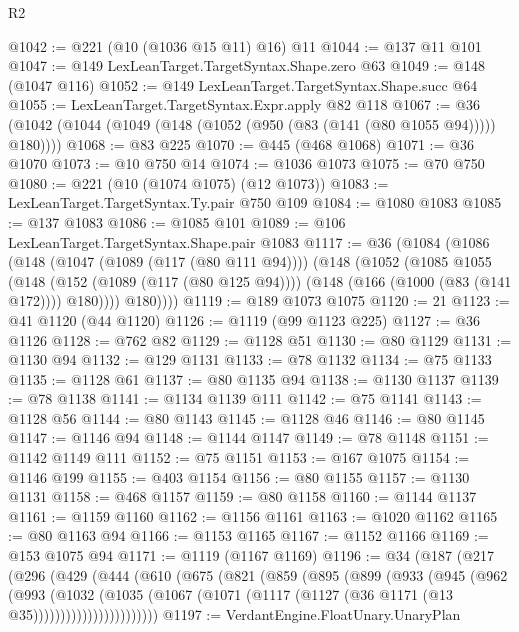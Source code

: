 \begin{lexlean}{R2}
\begin{coremodule}
@1042 := @221 (@10 (@1036 @15 @11) @16) @11
@1044 := @137 @11 @101
@1047 := @149 LexLeanTarget.TargetSyntax.Shape.zero @63
@1049 := @148 (@1047 @116)
@1052 := @149 LexLeanTarget.TargetSyntax.Shape.succ @64
@1055 := LexLeanTarget.TargetSyntax.Expr.apply @82 @118
@1067 := @36 (@1042 (@1044 (@1049 (@148 (@1052 (@950 (@83 (@141 (@80 @1055 @94))))) @180))))
@1068 := @83 @225
@1070 := @445 (@468 @1068)
@1071 := @36 @1070
@1073 := @10 @750 @14
@1074 := @1036 @1073
@1075 := @70 @750
@1080 := @221 (@10 (@1074 @1075) (@12 @1073))
@1083 := LexLeanTarget.TargetSyntax.Ty.pair @750 @109
@1084 := @1080 @1083
@1085 := @137 @1083
@1086 := @1085 @101
@1089 := @106 LexLeanTarget.TargetSyntax.Shape.pair @1083
@1117 := @36
    (@1084
      (@1086
        (@148
          (@1047 (@1089 (@117 (@80 @111 @94))))
          (@148
            (@1052
              (@1085
                @1055
                (@148
                  (@152 (@1089 (@117 (@80 @125 @94))))
                  (@148 (@166 (@1000 (@83 (@141 @172)))) @180))))
            @180))))
@1119 := @189 @1073 @1075
@1120 := 21
@1123 := @41 @1120 (@44 @1120)
@1126 := @1119 (@99 @1123 @225)
@1127 := @36 @1126
@1128 := @762 @82
@1129 := @1128 @51
@1130 := @80 @1129
@1131 := @1130 @94
@1132 := @129 @1131
@1133 := @78 @1132
@1134 := @75 @1133
@1135 := @1128 @61
@1137 := @80 @1135 @94
@1138 := @1130 @1137
@1139 := @78 @1138
@1141 := @1134 @1139 @111
@1142 := @75 @1141
@1143 := @1128 @56
@1144 := @80 @1143
@1145 := @1128 @46
@1146 := @80 @1145
@1147 := @1146 @94
@1148 := @1144 @1147
@1149 := @78 @1148
@1151 := @1142 @1149 @111
@1152 := @75 @1151
@1153 := @167 @1075
@1154 := @1146 @199
@1155 := @403 @1154
@1156 := @80 @1155
@1157 := @1130 @1131
@1158 := @468 @1157
@1159 := @80 @1158
@1160 := @1144 @1137
@1161 := @1159 @1160
@1162 := @1156 @1161
@1163 := @1020 @1162
@1165 := @80 @1163 @94
@1166 := @1153 @1165
@1167 := @1152 @1166
@1169 := @153 @1075 @94
@1171 := @1119 (@1167 @1169)
@1196 := @34
    (@187
      (@217
        (@296
          (@429
            (@444
              (@610
                (@675
                  (@821
                    (@859
                      (@895
                        (@899
                          (@933
                            (@945
                              (@962
                                (@993
                                  (@1032
                                    (@1035
                                      (@1067
                                        (@1071
                                          (@1117 (@1127 (@36 @1171 (@13 @35)))))))))))))))))))))))
@1197 := VerdantEngine.FloatUnary.UnaryPlan

\end{coremodule}
\end{lexlean}

